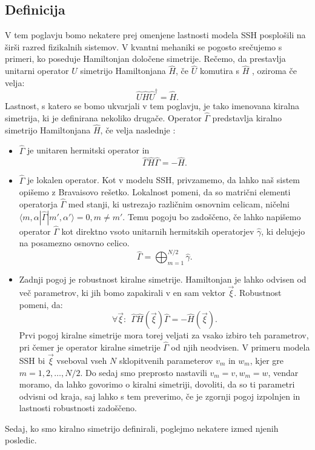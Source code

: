 \subsection{Definicija}
V tem poglavju bomo nekatere prej omenjene lastnosti modela SSH posplošili na širši razred fizikalnih sistemov.
V kvantni mehaniki se pogosto srečujemo s primeri, ko poseduje Hamiltonjan določene simetrije. Rečemo, da prestavlja unitarni operator $\hat{U}$ simetrijo Hamiltonjana $\hat{H}$, če $\hat{U}$ komutira s $\hat{H}$ \cite{symmetry}, oziroma če velja:
\begin{equation}
\hat{U} \hat{H} \hat{U}^\dagger = \hat{H}.
\end{equation}
Lastnost, s katero se bomo ukvarjali v tem poglavju, je tako imenovana kiralna simetrija, ki je definirana nekoliko drugače. Operator $\hat{\Gamma}$ predstavlja kiralno simetrijo Hamiltonjana $\hat{H}$, če velja naslednje \cite{madzar}:
\begin{itemize}
 \item $\hat{\Gamma}$ je unitaren hermitski operator in
\begin{equation}
\hat{\Gamma} \hat{H} \hat{\Gamma} = - \hat{H}.
\end{equation}
\item $\hat{\Gamma}$ je lokalen operator. Kot v modelu SSH, privzamemo, da lahko naš sistem opišemo z Bravaisovo rešetko. Lokalnost pomeni, da so matrični elementi operatorja $\hat{\Gamma}$ med stanji, ki ustrezajo različnim osnovnim celicam, ničelni $\langle m, \alpha | \hat{\Gamma} | m' , \alpha' \rangle = 0,  m \neq m'$. Temu pogoju bo zadoščeno, če lahko napišemo operator $\hat{\Gamma}$ kot direktno vsoto unitarnih hermitskih operatorjev $\hat{\gamma}$, ki delujejo na posamezno osnovno celico.
\begin{equation}
\hat{\Gamma} = \bigoplus_{m=1}^{N/2} \hat{\gamma}.
\end{equation}
\item Zadnji pogoj je robustnost kiralne simetrije. Hamiltonjan je lahko odvisen od več parametrov, ki jih bomo zapakirali v en sam vektor $\vec{\xi}$. Robustnost pomeni, da:
\begin{equation}
\forall \vec{\xi}:\ \    \hat{\Gamma} \hat{H}(\vec{\xi}) \hat{\Gamma} = - \hat{H}(\vec{\xi}).
\end{equation}
Prvi pogoj kiralne simetrije mora torej veljati za vsako izbiro teh parametrov, pri čemer je operator kiralne simetrije $\hat{\Gamma}$ od njih neodvisen. V primeru modela SSH bi $\vec{\xi}$ vseboval vseh $N$ sklopitvenih parameterov $v_m$ in $w_m$, kjer gre $m=1,2, \dots ,N/2$. Do sedaj smo preprosto nastavili $v_m = v, w_m = w$, vendar moramo, da lahko govorimo o kiralni simetriji, dovoliti, da so ti parametri odvisni od kraja, saj lahko s tem preverimo, če je zgornji pogoj izpolnjen in lastnosti robustnosti zadoščeno.
\end{itemize}
Sedaj, ko smo kiralno simetrijo definirali, poglejmo nekatere izmed njenih posledic.
